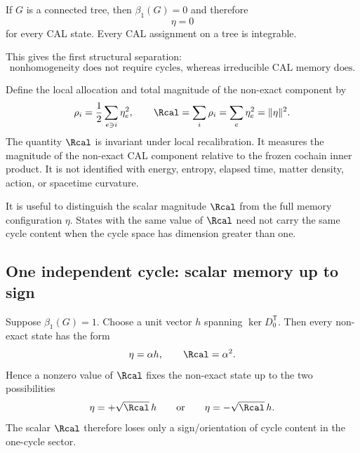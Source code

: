 \begin{corollary}
\label{cor:tree-rigidity}
If $G$ is a connected tree, then $\beta_1(G)=0$ and therefore
\begin{equation}
\eta=0
\end{equation}
for every CAL state. Every CAL assignment on a tree is integrable.
\end{corollary}

This gives the first structural separation:
\begin{equation}
\boxed{
\text{nonhomogeneity does not require cycles, whereas irreducible CAL memory does.}
}
\label{eq:nonhom-vs-memory}
\end{equation}

Define the local allocation and total magnitude of the non-exact component by
\begin{equation}
\rho_i=\frac12\sum_{e\ni i}\eta_e^2,
\qquad
\Rcal=\sum_i\rho_i=\sum_e\eta_e^2=\lVert\eta\rVert^2.
\label{eq:rho-R}
\end{equation}
The quantity $\Rcal$ is invariant under local recalibration. It measures the magnitude of the non-exact CAL component relative to the frozen cochain inner product. It is not identified with energy, entropy, elapsed time, matter density, action, or spacetime curvature.

It is useful to distinguish the scalar magnitude $\Rcal$ from the full memory configuration $\eta$. States with the same value of $\Rcal$ need not carry the same cycle content when the cycle space has dimension greater than one.

\subsection{One independent cycle: scalar memory up to sign}

Suppose $\beta_1(G)=1$. Choose a unit vector $h$ spanning $\ker D_0^{\mathsf T}$. Then every non-exact state has the form
\begin{equation}
\eta=\alpha h,
\qquad
\Rcal=\alpha^2.
\label{eq:beta1-one-coordinate}
\end{equation}
Hence a nonzero value of $\Rcal$ fixes the non-exact state up to the two possibilities
\begin{equation}
\eta=+\sqrt{\Rcal}\,h
\qquad\text{or}\qquad
\eta=-\sqrt{\Rcal}\,h.
\label{eq:beta1-one-two-points}
\end{equation}
The scalar $\Rcal$ therefore loses only a sign/orientation of cycle content in the one-cycle sector.

